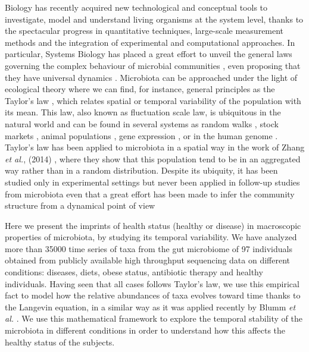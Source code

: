 Biology has recently acquired new technological and conceptual tools to investigate, model and understand living organisms at the system level, thanks to the spectacular progress in quantitative techniques, large-scale measurement methods and the integration of experimental and computational approaches. In particular, Systems Biology has placed a great effort to unveil the general laws governing the complex behaviour of microbial communities \cite{sysbio&microb, msys1, metasysbio}, even proposing that they have universal dynamics \cite{uni_dynam}. Microbiota can be approached under the light of ecological theory where we can find, for instance, general principles as the Taylor's law \cite{taylor}, which relates spatial or temporal variability of the population with its mean. This law, also known as fluctuation scale law, is ubiquitous in the natural world and can be found in several systems as random walks \cite{randomwalks}, stock markets \cite{economics1, economics2}, animal populations \cite{taylor, animal1, animal2}, gene expression \cite{genexpress}, or in the human genome \cite{genome}. Taylor's law has been applied to microbiota in a spatial way in the work of Zhang {\it et al.}, (2014) \cite{isme1}, where they show that this population tend to be in an aggregated way rather than in a random distribution. Despite its ubiquity, it has been studied only in experimental settings \cite{cohen_bac, ramslayer} but never been applied in follow-up studies from microbiota even that a great effort has been made to infer the community structure from a dynamical point of view \cite{cobas, schloss, ravel}  

Here we present the imprints of health status (healthy or disease) in macroscopic properties of microbiota, by studying its temporal variability. We have analyzed more than 35000 time series of taxa from the gut microbiome of 97 individuals obtained from publicly available high throughput sequencing data on different conditions: diseases, diets, obese status, antibiotic therapy and healthy individuals. Having seen that all cases follows Taylor's law, we use this empirical fact to model how the relative abundances of taxa evolves toward time thanks to the Langevin equation, in a similar way as it was applied recently by Blumm {\it et al.} \cite{ranking}. We use this mathematical framework to explore the temporal stability of the microbiota in different conditions in order to understand how this affects the healthy status of the subjects.